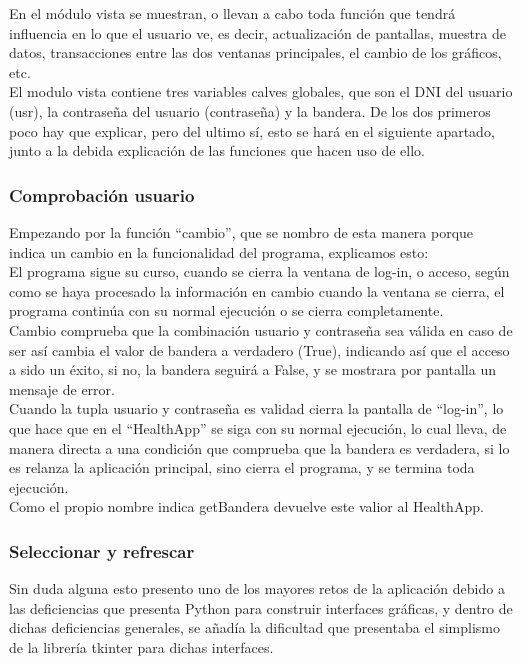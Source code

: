 En el módulo vista se muestran, o llevan a cabo toda función que tendrá influencia en lo que el usuario ve, es decir, actualización de pantallas, muestra de datos, transacciones entre las dos ventanas principales, el cambio de los gráficos, etc.\\

El modulo vista contiene tres variables calves globales, que son el DNI del usuario (usr), la contraseña del usuario (contraseña) y la bandera. De los dos primeros poco hay que explicar, pero del ultimo sí, esto se hará en el siguiente apartado, junto a la debida explicación de las funciones que hacen uso de ello.\\
\subsubsection{Comprobación usuario}
Empezando por la función “cambio”, que se nombro de esta manera porque indica un cambio en la funcionalidad del programa, explicamos esto:\\
El programa sigue su curso, cuando se cierra la ventana de log-in, o acceso, según como se haya procesado la información en cambio cuando la ventana se cierra, el programa continúa con su normal ejecución o se cierra completamente.\\

Cambio comprueba que la combinación usuario y contraseña sea válida en caso de ser así cambia el valor de bandera a verdadero (True), indicando así que el acceso a sido un éxito, si no, la bandera seguirá a False, y se mostrara por pantalla un mensaje de error.\\

Cuando la tupla usuario y contraseña es validad cierra la pantalla de “log-in”, lo que hace que en el “HealthApp” se siga con su normal ejecución, lo cual lleva, de manera directa a una condición que comprueba que la bandera es verdadera, si lo es relanza la aplicación principal, sino cierra el programa, y se termina toda ejecución.\\

Como el propio nombre indica getBandera devuelve este valior al HealthApp.\\

\subsubsection{Seleccionar y refrescar}
Sin duda alguna esto presento uno de los mayores retos de la aplicación debido a las deficiencias que presenta Python para construir interfaces gráficas, y dentro de dichas deficiencias generales, se añadía la dificultad que presentaba el simplismo de la librería tkinter para dichas interfaces.\\

